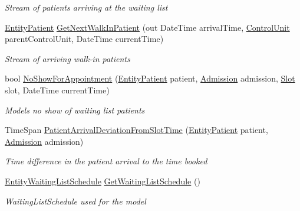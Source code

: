 \begin{DoxyCompactItemize}
\begin{DoxyCompactList}\small\item\em Stream of patients arriving at the waiting list \end{DoxyCompactList}\item 
\hyperlink{class_general_health_care_elements_1_1_entities_1_1_entity_patient}{Entity\+Patient} \hyperlink{interface_general_health_care_elements_1_1_department_models_1_1_outpatient_1_1_i_input_outpatient_a1e3e3abff32608d17c826067f8d04219}{Get\+Next\+Walk\+In\+Patient} (out Date\+Time arrival\+Time, \hyperlink{class_simulation_core_1_1_h_c_c_m_elements_1_1_control_unit}{Control\+Unit} parent\+Control\+Unit, Date\+Time current\+Time)
\begin{DoxyCompactList}\small\item\em Stream of arriving walk-\/in patients \end{DoxyCompactList}\item 
bool \hyperlink{interface_general_health_care_elements_1_1_department_models_1_1_outpatient_1_1_i_input_outpatient_a059b0710e6b6d309ed565bca4411e5ce}{No\+Show\+For\+Appointment} (\hyperlink{class_general_health_care_elements_1_1_entities_1_1_entity_patient}{Entity\+Patient} patient, \hyperlink{class_general_health_care_elements_1_1_treatment_admission_types_1_1_admission}{Admission} admission, \hyperlink{class_general_health_care_elements_1_1_booking_models_1_1_slot}{Slot} slot, Date\+Time current\+Time)
\begin{DoxyCompactList}\small\item\em Models no show of waiting list patients \end{DoxyCompactList}\item 
Time\+Span \hyperlink{interface_general_health_care_elements_1_1_department_models_1_1_outpatient_1_1_i_input_outpatient_aeee4dfefc7b6f46445a8d8ce3d0e27f6}{Patient\+Arrival\+Deviation\+From\+Slot\+Time} (\hyperlink{class_general_health_care_elements_1_1_entities_1_1_entity_patient}{Entity\+Patient} patient, \hyperlink{class_general_health_care_elements_1_1_treatment_admission_types_1_1_admission}{Admission} admission)
\begin{DoxyCompactList}\small\item\em Time difference in the patient arrival to the time booked \end{DoxyCompactList}\item 
\hyperlink{class_general_health_care_elements_1_1_booking_models_1_1_entity_waiting_list_schedule}{Entity\+Waiting\+List\+Schedule} \hyperlink{interface_general_health_care_elements_1_1_department_models_1_1_outpatient_1_1_i_input_outpatient_aa675cb21abe23c6fc17b7f279d28e75a}{Get\+Waiting\+List\+Schedule} ()
\begin{DoxyCompactList}\small\item\em Waiting\+List\+Schedule used for the model \end{DoxyCompactList}\end{DoxyCompactItemize}
